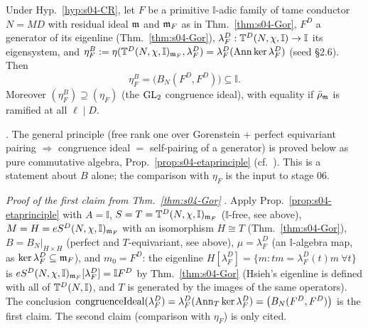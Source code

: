 \begin{theorem}\label{thm:s04-etaB}
Under Hyp.~\ref{hyp:s04-CR}, let $F$ be a primitive $\mathbb I$-adic family of tame conductor $N=MD$ with residual ideal $\mathfrak{m}$ and $\mathfrak{m}_F$ as in Thm.~\ref{thm:s04-Gor}, $F^D$ a
generator of its eigenline (Thm.~\ref{thm:s04-Gor}), $\lambda^D_F:\mathbb{T}^D(N,\chi,\mathbb I)\to\mathbb I$ its eigensystem, and
$\eta^B_F:=\eta(\mathbb{T}^D(N,\chi,\mathbb I)_{\mathfrak{m}_F},\lambda^D_F)=\lambda^D_F(\operatorname{Ann}\ker\lambda^D_F)$ (seed \S2.6). Then
\[\eta^B_F=\big(B_N(F^D,F^D)\big)\subseteq\mathbb I .\]
Moreover $(\eta^B_F)\supseteq(\eta_F)$ (the $\mathrm{GL}_2$ congruence ideal), with equality if $\bar\rho_{\mathfrak{m}}$ is ramified at all $\ell\mid D$.
\end{theorem}
\noindent\stcited{} . The general principle (free rank one over Gorenstein
+ perfect equivariant pairing $\Rightarrow$ congruence ideal $=$ self-pairing of a generator) is proved below as pure commutative
algebra, Prop.~\ref{prop:s04-etaprinciple} (cf.\ ). This is
a statement about $B$ alone; the comparison with $\eta_F$ is the input to stage 06.

\noindent\emph{Proof of the first claim from Thm.~\ref{thm:s04-Gor}} \stpmc. Apply Prop.~\ref{prop:s04-etaprinciple} with $A=\mathbb I$,
$S=T=\mathbb{T}^D(N,\chi,\mathbb I)_{\mathfrak{m}_F}$ ($\mathbb I$-free, see above), $M=H=eS^D(N,\chi,\mathbb I)_{\mathfrak{m}_F}$ with an isomorphism $H\cong T$
(Thm.~\ref{thm:s04-Gor}), $B=B_N|_{H\times H}$ (perfect and $T$-equivariant, see above), $\mu=\lambda^D_F$ (an $\mathbb I$-algebra map, as
$\ker\lambda^D_F\subseteq\mathfrak{m}_F$), and $m_0=F^D$: the eigenline $H[\lambda^D_F]=\{m:tm=\lambda^D_F(t)m\ \forall t\}$ is
$eS^D(N,\chi,\mathbb I)_{\mathfrak{m}_F}[\lambda^D_F]=\mathbb I F^D$ by Thm.~\ref{thm:s04-Gor} (Hsieh's eigenline is defined with all of
$\mathbb{T}^D(N,\mathbb I)$, and $T$ is generated by the images of the same operators). The conclusion
$\mathrm{congruenceIdeal}(\lambda^D_F)=\lambda^D_F(\operatorname{Ann}_T\ker\lambda^D_F)=\big(B_N(F^D,F^D)\big)$ is the first claim. The second claim
(comparison with $\eta_F$) is only cited.

